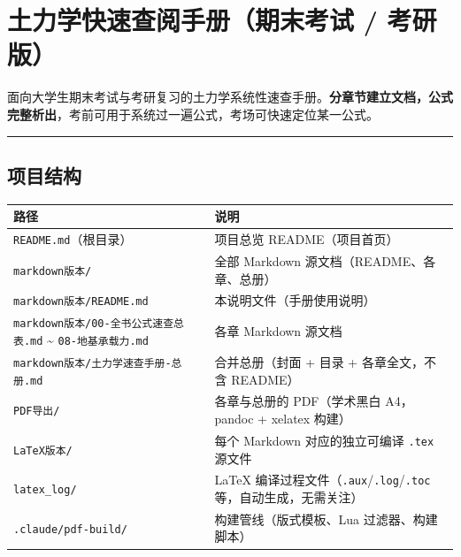 \documentclass[
]{article}
\author{}
\date{}
\newcounter{none} %
\begin{document}
\section{土力学快速查阅手册（期末考试 /
考研版）}\label{ux571fux529bux5b66ux5febux901fux67e5ux9605ux624bux518cux671fux672bux8003ux8bd5-ux8003ux7814ux7248}

面向大学生期末考试与考研复习的土力学系统性速查手册。\textbf{分章节建立文档，公式完整析出}，考前可用于系统过一遍公式，考场可快速定位某一公式。

\begin{center}\rule{0.5\linewidth}{0.5pt}\end{center}

\subsection{项目结构}\label{ux9879ux76eeux7ed3ux6784}

{\def\LTcaptype{none} %
\begin{longtable}[]{@{}
  >{\raggedright\arraybackslash}p{}
  >{\raggedright\arraybackslash}p{}@{}}
\toprule\noalign{}
\begin{minipage}[b]{\linewidth}\raggedright
路径
\end{minipage} & \begin{minipage}[b]{\linewidth}\raggedright
说明
\end{minipage} \\
\midrule\noalign{}
\endhead
\bottomrule\noalign{}
\endlastfoot
\texttt{README.md}（根目录） & 项目总览 README（项目首页） \\
\texttt{markdown版本/} & 全部 Markdown 源文档（README、各章、总册） \\
\texttt{markdown版本/README.md} & 本说明文件（手册使用说明） \\
\texttt{markdown版本/00-全书公式速查总表.md} \textasciitilde{}
\texttt{08-地基承载力.md} & 各章 Markdown 源文档 \\
\texttt{markdown版本/土力学速查手册-总册.md} & 合并总册（封面 + 目录 +
各章全文，不含 README） \\
\texttt{PDF导出/} & 各章与总册的 PDF（学术黑白 A4，pandoc + xelatex
构建） \\
\texttt{LaTeX版本/} & 每个 Markdown 对应的独立可编译 \texttt{.tex}
源文件 \\
\texttt{latex\_log/} & LaTeX
编译过程文件（\texttt{.aux}/\texttt{.log}/\texttt{.toc}
等，自动生成，无需关注） \\
\texttt{.claude/pdf-build/} & 构建管线（版式模板、Lua
过滤器、构建脚本） \\
\end{longtable}
}
\end{document}
